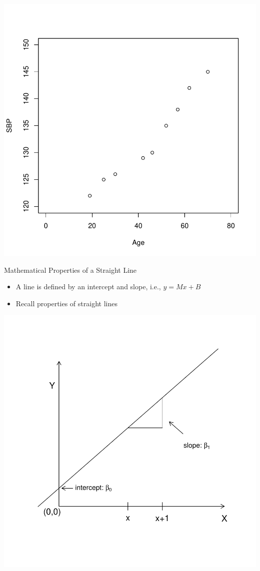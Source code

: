 \documentclass[handout,x11names,unknownkeysallowed]{beamer}
\makeatletter
\newcommand{\beamitem}{\begin{itemize}[<+-|alert@+>]}
\makeatother
\begin{document}
\begin{frame}
 \begin{center} 


\includegraphics[width=.6\textwidth]{regression_fictitious.pdf}
\end{center}
\end{frame}



\begin{frame}
Mathematical Properties of a Straight Line 

\beamitem
\item A line is defined by an intercept and slope, i.e., $y = Mx + B$
\item Recall properties of straight lines

\end{itemize}
\end{frame}

\begin{frame}
 \begin{center} 



\includegraphics[width=.6\textwidth]{reg_fig2.pdf}
\end{center}
\end{frame}
\end{document}

